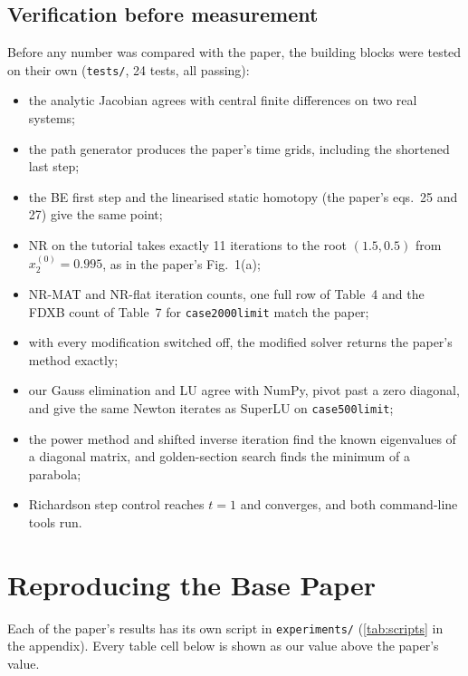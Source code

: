 \documentclass[11pt,a4paper]{article}
\newcommand{\code}[1]{\texttt{#1}}
\begin{document}
\subsection{Verification before measurement}
Before any number was compared with the paper, the building blocks were tested on their own
(\code{tests/}, 24 tests, all passing):
\begin{itemize}
  \item the analytic Jacobian agrees with central finite differences on two real systems;
  \item the path generator produces the paper's time grids, including the shortened last step;
  \item the BE first step and the linearised static homotopy (the paper's eqs.~25 and 27) give the same point;
  \item NR on the tutorial takes exactly 11 iterations to the root $(1.5,0.5)$ from $x_2^{(0)}=0.995$, as in the paper's Fig.~1(a);
  \item NR-MAT and NR-flat iteration counts, one full row of Table~4 and the FDXB count of Table~7 for \code{case2000limit} match the paper;
  \item with every modification switched off, the modified solver returns the paper's method exactly;
  \item our Gauss elimination and LU agree with NumPy, pivot past a zero diagonal, and give the same
        Newton iterates as SuperLU on \code{case500limit};
  \item the power method and shifted inverse iteration find the known eigenvalues of a diagonal matrix,
        and golden-section search finds the minimum of a parabola;
  \item Richardson step control reaches $t=1$ and converges, and both command-line tools run.
\end{itemize}

\section{Reproducing the Base Paper}\label{sec:repro}

Each of the paper's results has its own script in \code{experiments/} (\cref{tab:scripts} in the appendix).
Every table cell below is shown as our value above the paper's value.
\end{document}
